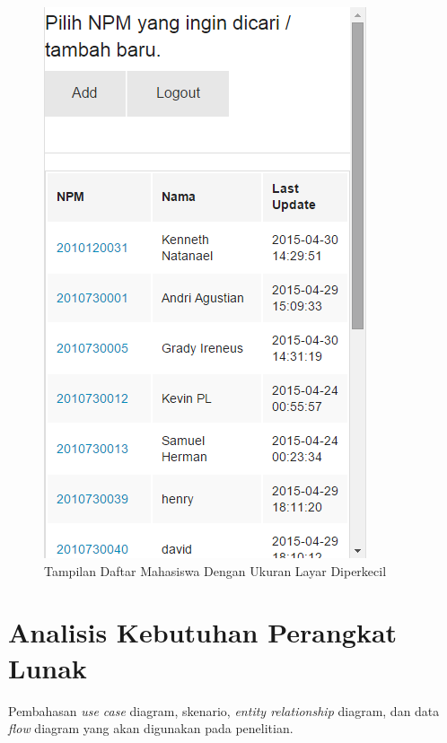 \begin{figure}[ht]
\centering
\includegraphics[scale=0.5]{Gambar/contohzurb1.png}
\caption[Tampilan Daftar Mahasiswa Dengan Ukuran Layar Diperkecil]{Tampilan Daftar Mahasiswa Dengan Ukuran Layar Diperkecil}
\label{fig:contohzurb1}
\end{figure}

\section{Analisis Kebutuhan Perangkat Lunak}
\label{sec:analisiskebutuhanperangkatlunak}

Pembahasan {\it use case} diagram, skenario, {\it entity relationship} diagram, dan data {\it flow} diagram yang akan digunakan pada penelitian.

